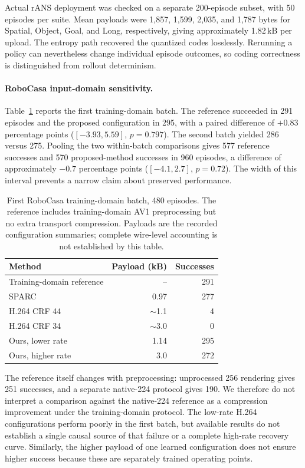 Actual rANS deployment was checked on a separate 200-episode subset,
with 50 episodes per suite. Mean payloads were 1,857, 1,599, 2,035, and
1,787 bytes for Spatial, Object, Goal, and Long, respectively, giving
approximately 1.82\,kB per upload. The entropy path recovered the
quantized codes losslessly. Rerunning a policy can nevertheless change
individual episode outcomes, so coding correctness is distinguished
from rollout determinism.

\paragraph{RoboCasa input-domain sensitivity.}
Table~\ref{tab:robocasa} reports the first training-domain batch. The
reference succeeded in 291 episodes and the proposed configuration in
295, with a paired difference of $+0.83$ percentage points
($[-3.93,5.59]$, $p=0.797$). The second batch yielded 286 versus 275.
Pooling the two within-batch comparisons gives 577 reference successes
and 570 proposed-method successes in 960 episodes, a difference of
approximately $-0.7$ percentage points ($[-4.1,2.7]$, $p=0.72$).
The width of this interval prevents a narrow claim about preserved
performance.

\begin{table}[t]
\caption{First RoboCasa training-domain batch, 480 episodes. The
reference includes training-domain AV1 preprocessing but no extra
transport compression. Payloads are the recorded configuration summaries;
complete wire-level accounting is not established by this table.}
\label{tab:robocasa}
\centering\small
\begin{tabular}{lrr}
\toprule
Method & Payload (kB) & Successes \\
\midrule
Training-domain reference & -- & 291 \\
SPARC & 0.97 & 277 \\
H.264 CRF 44 & $\sim$1.1 & 4 \\
H.264 CRF 34 & $\sim$3.0 & 0 \\
Ours, lower rate & 1.14 & 295 \\
Ours, higher rate & 3.0 & 272 \\
\bottomrule
\end{tabular}
\end{table}

The reference itself changes with preprocessing: unprocessed 256
rendering gives 251 successes, and a separate native-224 protocol gives
190. We therefore do not interpret a comparison against the native-224
reference as a compression improvement under the training-domain
protocol. The low-rate H.264 configurations perform poorly in the first
batch, but available results do not establish a single causal source of
that failure or a complete high-rate recovery curve. Similarly, the
higher payload of one learned configuration does not ensure higher
success because these are separately trained operating points.

